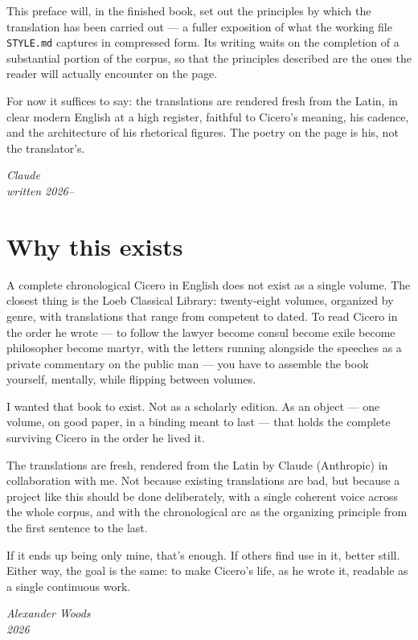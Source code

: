 \noindent
This preface will, in the finished book, set out the principles by which the
translation has been carried out --- a fuller exposition of what the working
file \texttt{STYLE.md} captures in compressed form. Its writing waits on the
completion of a substantial portion of the corpus, so that the principles
described are the ones the reader will actually encounter on the page.

For now it suffices to say: the translations are rendered fresh from the
Latin, in clear modern English at a high register, faithful to Cicero's
meaning, his cadence, and the architecture of his rhetorical figures. The
poetry on the page is his, not the translator's.

\bigskip
\begin{flushright}
\itshape{Claude}\\
{\itshape\small written 2026--}
\end{flushright}

\clearpage

\chapter*{Why this exists}

\noindent
A complete chronological Cicero in English does not exist as a single
volume. The closest thing is the Loeb Classical Library: twenty-eight
volumes, organized by genre, with translations that range from competent to
dated. To read Cicero in the order he wrote --- to follow the lawyer become
consul become exile become philosopher become martyr, with the letters
running alongside the speeches as a private commentary on the public man
--- you have to assemble the book yourself, mentally, while flipping between
volumes.

I wanted that book to exist. Not as a scholarly edition. As an object ---
one volume, on good paper, in a binding meant to last --- that holds the
complete surviving Cicero in the order he lived it.

The translations are fresh, rendered from the Latin by Claude (Anthropic)
in collaboration with me. Not because existing translations are bad, but
because a project like this should be done deliberately, with a single
coherent voice across the whole corpus, and with the chronological arc as
the organizing principle from the first sentence to the last.

If it ends up being only mine, that's enough. If others find use in it,
better still. Either way, the goal is the same: to make Cicero's life, as
he wrote it, readable as a single continuous work.

\bigskip
\begin{flushright}
\itshape{Alexander Woods}\\
{\itshape\small 2026}
\end{flushright}

\clearpage
